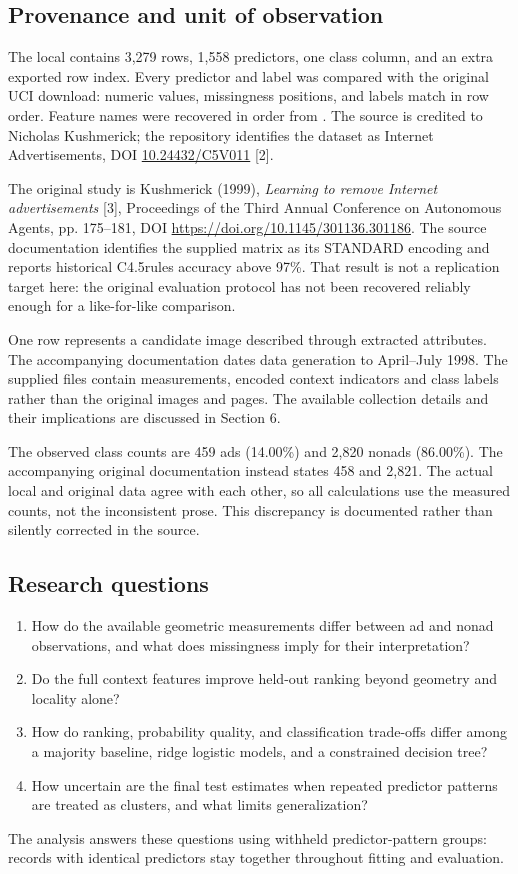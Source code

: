 \documentclass[11pt,a4paper]{article}
\newcommand{\code}[1]{\texttt{\detokenize{#1}}}
\begin{document}
\subsection{Provenance and unit of observation}
The local \code{data/add.csv} contains 3,279 rows, 1,558 predictors, one class column, and an extra exported row index. Every predictor and label was compared with the original UCI \code{ad.data} download: numeric values, missingness positions, and labels match in row order. Feature names were recovered in order from \code{ad.names}. The source is credited to Nicholas Kushmerick; the repository identifies the dataset as Internet Advertisements, DOI \href{https://doi.org/10.24432/C5V011}{10.24432/C5V011} [2].

The original study is Kushmerick (1999), \emph{Learning to remove Internet advertisements} [3], Proceedings of the Third Annual Conference on Autonomous Agents, pp. 175--181, DOI \url{https://doi.org/10.1145/301136.301186}. The source documentation identifies the supplied matrix as its STANDARD encoding and reports historical C4.5rules accuracy above 97\%. That result is not a replication target here: the original evaluation protocol has not been recovered reliably enough for a like-for-like comparison.

One row represents a candidate image described through extracted attributes. The accompanying documentation dates data generation to April--July 1998. The supplied files contain measurements, encoded context indicators and class labels rather than the original images and pages. The available collection details and their implications are discussed in Section 6.

The observed class counts are 459 ads (14.00\%) and 2,820 nonads (86.00\%). The accompanying original documentation instead states 458 and 2,821. The actual local and original data agree with each other, so all calculations use the measured counts, not the inconsistent prose. This discrepancy is documented rather than silently corrected in the source.

\subsection{Research questions}
\begin{enumerate}
\item How do the available geometric measurements differ between ad and nonad observations, and what does missingness imply for their interpretation?
\item Do the full context features improve held-out ranking beyond geometry and locality alone?
\item How do ranking, probability quality, and classification trade-offs differ among a majority baseline, ridge logistic models, and a constrained decision tree?
\item How uncertain are the final test estimates when repeated predictor patterns are treated as clusters, and what limits generalization?
\end{enumerate}
The analysis answers these questions using withheld predictor-pattern groups: records with identical predictors stay together throughout fitting and evaluation.
\end{document}
